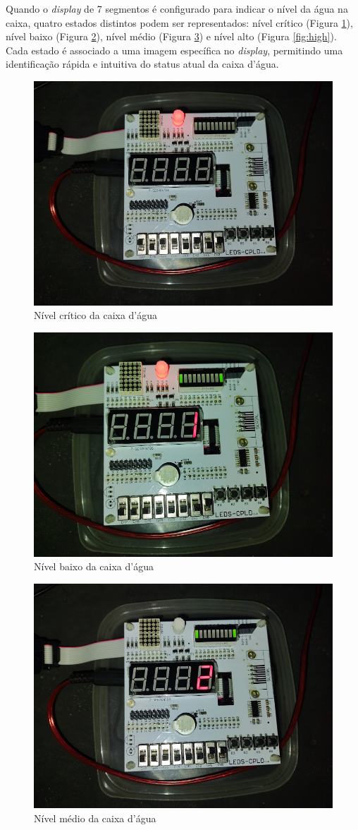 \documentclass[
	article,			%
	11pt,				%
	oneside,			%
	a4paper,			%
	english,			%
	brazil,				%
	sumario=tradicional
	]{abntex2}
\begin{document}
Quando o \textit{display} de 7 segmentos é configurado para indicar o nível da água na caixa, quatro estados distintos podem ser representados: nível crítico (Figura \ref{fig:critic}), nível baixo (Figura \ref{fig:low}), nível médio (Figura \ref{fig:mid}) e nível alto (Figura \ref{fig:high}). Cada estado é associado a uma imagem específica no \textit{display}, permitindo uma identificação rápida e intuitiva do status atual da caixa d’água.

\begin{figure}[H]
    \centering
    \includegraphics[width=0.5\linewidth]{display-critic.png}
    \caption{Nível crítico da caixa d'água}
    \label{fig:critic}
\end{figure}
\begin{figure}[H]
    \centering
    \includegraphics[width=0.5\linewidth]{low.png}
    \caption{Nível baixo da caixa d'água}
    \label{fig:low}
\end{figure}
\begin{figure}[H]
    \centering
    \includegraphics[width=0.5\linewidth]{mid.png}
    \caption{Nível médio da caixa d'água}
    \label{fig:mid}
\end{figure}
\end{document}
